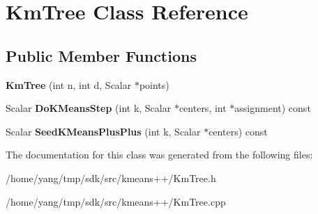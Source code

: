 \hypertarget{class_km_tree}{}\section{Km\+Tree Class Reference}
\label{class_km_tree}
\subsection*{Public Member Functions}
\begin{DoxyCompactItemize}
\item 
{\bfseries Km\+Tree} (int n, int d, Scalar $\ast$points)\hypertarget{class_km_tree_ab86dfb43ceeb09b8a77d44b116d7d36c}{}\label{class_km_tree_ab86dfb43ceeb09b8a77d44b116d7d36c}

\item 
Scalar {\bfseries Do\+K\+Means\+Step} (int k, Scalar $\ast$centers, int $\ast$assignment) const \hypertarget{class_km_tree_a22511679f8f8549fae85c3fde6d0c979}{}\label{class_km_tree_a22511679f8f8549fae85c3fde6d0c979}

\item 
Scalar {\bfseries Seed\+K\+Means\+Plus\+Plus} (int k, Scalar $\ast$centers) const \hypertarget{class_km_tree_aa7d26e014ccd97f11152a0b8396e5180}{}\label{class_km_tree_aa7d26e014ccd97f11152a0b8396e5180}

\end{DoxyCompactItemize}


The documentation for this class was generated from the following files\+:\begin{DoxyCompactItemize}
\item 
/home/yang/tmp/sdk/src/kmeans++/Km\+Tree.\+h\item 
/home/yang/tmp/sdk/src/kmeans++/Km\+Tree.\+cpp\end{DoxyCompactItemize}
